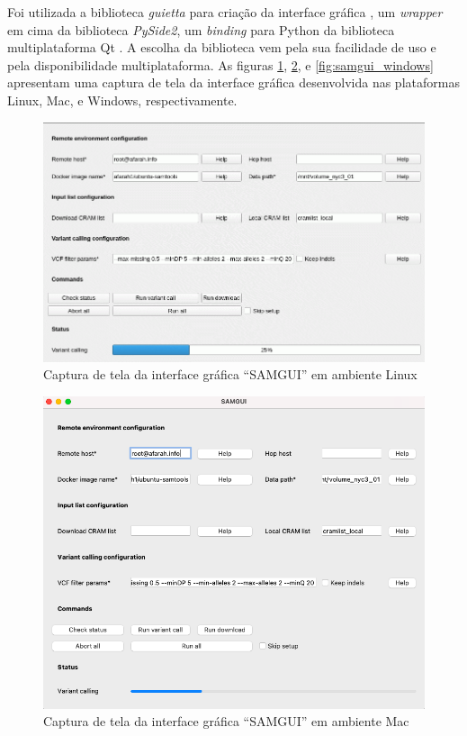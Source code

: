 \documentclass[cic,tc]{iiufrgs}
\begin{document}
Foi utilizada a biblioteca \textit{guietta} para criação da interface
gráfica \cite{guietta}, um \textit{wrapper} em cima da biblioteca
\textit{PySide2}, um \textit{binding} para Python da biblioteca multiplataforma
Qt \cite{loganathan2013pyside}. A escolha da biblioteca vem pela sua facilidade
de uso e pela disponibilidade multiplataforma. As figuras
\ref{fig:samgui_linux}, \ref{fig:samgui_mac}, e \ref{fig:samgui_windows}
apresentam uma captura de tela da interface gráfica desenvolvida nas
plataformas Linux, Mac, e Windows, respectivamente.

\begin{figure}
  \caption{Captura de tela da interface gráfica ``SAMGUI'' em ambiente Linux}
    \begin{center}
      \includegraphics[width=0.85\linewidth]{img/samgui_linux.png}
    \end{center}
    \label{fig:samgui_linux}
\end{figure}

\begin{figure}
  \caption{Captura de tela da interface gráfica ``SAMGUI'' em ambiente Mac}
    \begin{center}
      \includegraphics[width=0.85\linewidth]{img/samgui_mac.png}
    \end{center}
    \label{fig:samgui_mac}
\end{figure}
\end{document}
